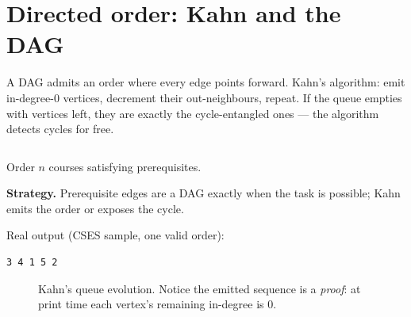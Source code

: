 \section{Directed order: Kahn and the DAG}\label{sec:topo}
A DAG admits an order where every edge points forward. Kahn's
algorithm: emit in-degree-0 vertices, decrement their out-neighbours,
repeat. If the queue empties with vertices left, they are exactly the
cycle-entangled ones --- the algorithm detects cycles for free.
\begin{lstlisting}[language=C++,caption={\texttt{toposort.h}: Kahn;
short order $=$ cycle.},label={lst:kahn}]
\end{lstlisting}

\begin{example}\label{ex:course}
Order $n$ courses satisfying prerequisites.
\par\smallskip
\textbf{Strategy.} Prerequisite edges are a DAG exactly when the task
is possible; Kahn emits the order or exposes the cycle.
\par\smallskip
\begin{solution}

Real output (CSES sample, one valid order):
\begin{lstlisting}[numbers=none]
3 4 1 5 2
\end{lstlisting}
\end{solution}
\end{example}
\begin{figure}[ht]\centering

\caption{Kahn's queue evolution. Notice the emitted sequence is a
\emph{proof}: at print time each vertex's remaining in-degree is 0.}
\label{fig:kahn}
\end{figure}

